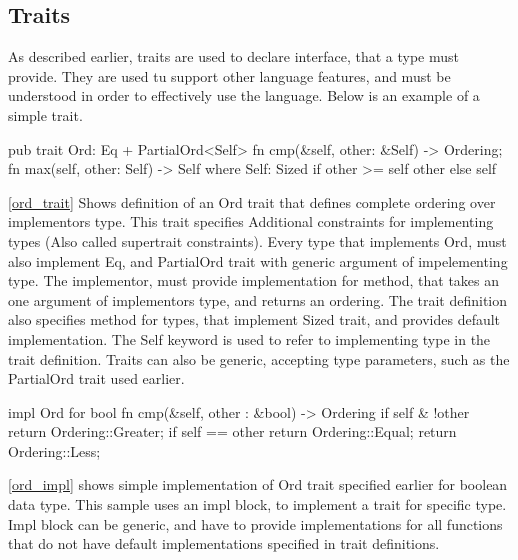 \subsection{Traits}
As described earlier, traits are used to declare interface, that a type must provide. They are used tu support
other language features, and must be understood in order to effectively use the language.
Below is an example of a simple trait.


\begin{code}[language=rust,label={ord_trait},caption={Trait definition}]
    pub trait Ord: Eq + PartialOrd<Self> {
        fn cmp(&self, other: &Self) -> Ordering;
        fn max(self, other: Self) -> Self where Self: Sized {
            if other >= self { other } else { self }
        }
    }
\end{code}

\autoref{ord_trait} Shows definition of an Ord trait that defines complete ordering over implementors type. This trait specifies Additional constraints for implementing types
(Also called supertrait constraints). Every type that implements Ord, must also implement Eq, and PartialOrd trait with generic
argument of impelementing type. The implementor, must provide implementation for  method, that takes an one argument of implementors type,
and returns an ordering. The trait definition also specifies  method for types, that implement Sized trait, and provides default
implementation.
The Self keyword is used to refer to implementing type in the trait definition.
Traits can also be generic, accepting type parameters, such as the PartialOrd trait used earlier.

\begin{code}[language=rust,label={ord_impl},caption={Trait implementation}]
    impl Ord for bool {
        fn cmp(&self, other : &bool) -> Ordering {
            if self & !other {
                return Ordering::Greater;
            }
            if self == other {
                return Ordering::Equal;
            }
            return Ordering::Less;
        }
    }
\end{code}

\autoref{ord_impl} shows simple implementation of Ord trait specified earlier for boolean data type. This sample
uses an impl block, to implement a trait for specific type. Impl block can be generic, and have to provide
implementations for all functions that do not have default implementations specified in trait definitions.

